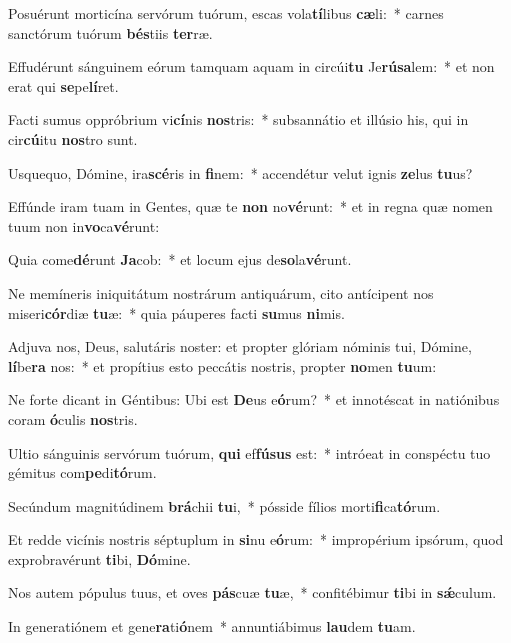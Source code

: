 \item Posuérunt morticína servórum tuórum, escas vola\textbf{tí}libus \textbf{cæ}li:~* carnes sanctórum tuórum \textbf{bés}tiis \textbf{ter}ræ.
\item Effudérunt sánguinem eórum tamquam aquam in circúi\textbf{tu} Je\textbf{rú}\textbf{sa}lem:~* et non erat qui \textbf{se}pe\textbf{lí}ret.
\item Facti sumus oppróbrium vi\textbf{cí}nis \textbf{nos}tris:~* subsannátio et illúsio his, qui in cir\textbf{cú}itu \textbf{nos}tro sunt.
\item Usquequo, Dómine, ira\textbf{scé}ris in \textbf{fi}nem:~* accendétur velut ignis \textbf{ze}lus \textbf{tu}us?
\item Effúnde iram tuam in Gentes, quæ te \textbf{non} no\textbf{vé}runt:~* et in regna quæ nomen tuum non in\textbf{vo}ca\textbf{vé}runt:
\item Quia come\textbf{dé}runt \textbf{Ja}cob:~* et locum ejus de\textbf{so}la\textbf{vé}runt.
\item Ne memíneris iniquitátum nostrárum antiquárum, cito antícipent nos miseri\textbf{cór}diæ \textbf{tu}æ:~* quia páuperes facti \textbf{su}mus \textbf{ni}mis.
\item Adjuva nos, Deus, salutáris noster: et propter glóriam nóminis tui, Dómine, \textbf{lí}be\textbf{ra} nos:~* et propítius esto peccátis nostris, propter \textbf{no}men \textbf{tu}um:
\item Ne forte dicant in Géntibus: Ubi est \textbf{De}us e\textbf{ó}rum?~* et innotéscat in natiónibus coram \textbf{ó}culis \textbf{nos}tris.
\item Ultio sánguinis servórum tuórum, \textbf{qui} ef\textbf{fú}\textbf{sus} est:~* intróeat in conspéctu tuo gémitus com\textbf{pe}di\textbf{tó}rum.
\item Secúndum magnitúdinem \textbf{brá}chii \textbf{tu}i,~* pósside fílios morti\textbf{fi}ca\textbf{tó}rum.
\item Et redde vicínis nostris séptuplum in \textbf{si}nu e\textbf{ó}rum:~* impropérium ipsórum, quod exprobravérunt \textbf{ti}bi, \textbf{Dó}mine.
\item Nos autem pópulus tuus, et oves \textbf{pás}cuæ \textbf{tu}æ,~* confitébimur \textbf{ti}bi in \textbf{sǽ}culum.
\item In generatiónem et gene\textbf{ra}ti\textbf{ó}nem~* annuntiábimus \textbf{lau}dem \textbf{tu}am.
